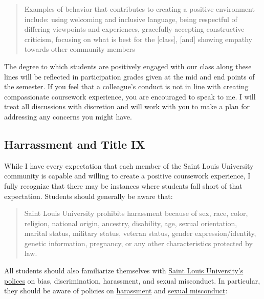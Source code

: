 \documentclass[
]{book}
\begin{document}
\begin{quote}
Examples of behavior that contributes to creating a positive environment include: using welcoming and inclusive language, being respectful of differing viewpoints and experiences, gracefully accepting constructive criticism, focusing on what is best for the {[}class{]}, {[}and{]} showing empathy towards other community members
\end{quote}

The degree to which students are positively engaged with our class along these lines will be reflected in participation grades given at the mid and end points of the semester. If you feel that a colleague's conduct is not in line with creating compassionate coursework experience, you are encouraged to speak to me. I will treat all discussions with discretion and will work with you to make a plan for addressing any concerns you might have.

\hypertarget{harrassment-and-title-ix}{%
\subsection{Harrassment and Title IX}\label{harrassment-and-title-ix}}

While I have every expectation that each member of the Saint Louis University community is capable and willing to create a positive coursework experience, I fully recognize that there may be instances where students fall short of that expectation. Students should generally be aware that:

\begin{quote}
Saint Louis University prohibits harassment because of sex, race, color, religion, national origin, ancestry, disability, age, sexual orientation, marital status, military status, veteran status, gender expression/identity, genetic information, pregnancy, or any other characteristics protected by law.
\end{quote}

All students should also familiarize themselves with \href{http://www.slu.edu/general-counsel/institutional-equity-diversity/}{Saint Louis University's polices} on bias, discrimination, harassment, and sexual misconduct. In particular, they should be aware of policies on \href{http://www.slu.edu/general-counsel/institutional-equity-diversity/harassment.php}{harassment} and \href{https://www.slu.edu/about/safety/sexual-assault-resources.php}{sexual misconduct}:
\end{document}

